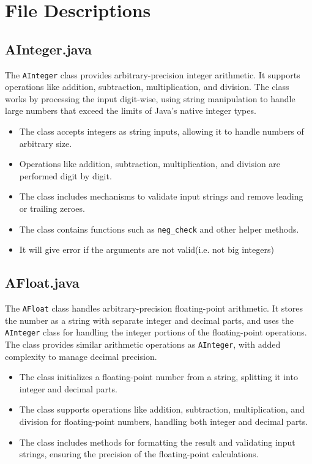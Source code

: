 \documentclass[12pt]{article}
\begin{document}
\section{File Descriptions}
\subsection{AInteger.java}
The \texttt{AInteger} class provides arbitrary-precision integer arithmetic. It supports operations like addition, subtraction, multiplication, and division. The class works by processing the input digit-wise, using string manipulation to handle large numbers that exceed the limits of Java's native integer types.

\begin{itemize}
    \item The class accepts integers as string inputs, allowing it to handle numbers of arbitrary size.
    \item Operations like addition, subtraction, multiplication, and division are performed digit by digit.
    \item The class includes mechanisms to validate input strings and remove leading or trailing zeroes.
    \item The class contains functions such as \texttt{neg\_check} and other helper methods.
    \item It will give error if the arguments are not valid(i.e. not big integers)
\end{itemize}


\subsection{AFloat.java}
The \texttt{AFloat} class handles arbitrary-precision floating-point arithmetic. It stores the number as a string with separate integer and decimal parts, and uses the \texttt{AInteger} class for handling the integer portions of the floating-point operations. The class provides similar arithmetic operations as \texttt{AInteger}, with added complexity to manage decimal precision.

\begin{itemize}
    \item The class initializes a floating-point number from a string, splitting it into integer and decimal parts.
    \item The class supports operations like addition, subtraction, multiplication, and division for floating-point numbers, handling both integer and decimal parts.
    \item The class includes methods for formatting the result and validating input strings, ensuring the precision of the floating-point calculations.
\end{itemize}
\end{document}
